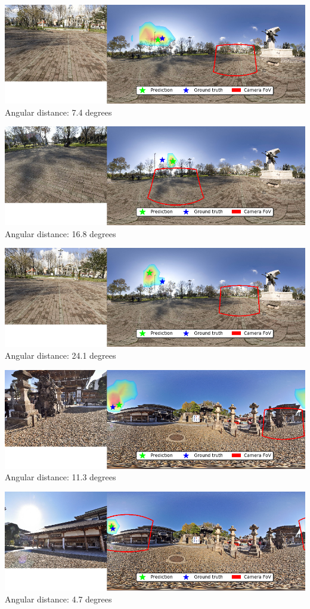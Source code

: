 \begin{multicols}{2}
\includegraphics[width=\mywidth]{pano_aaqhsrljfiqght_005.jpg}\\
Angular distance: 7.4 degrees

\includegraphics[width=\mywidth]{pano_aaqhsrljfiqght_002.jpg}\\
Angular distance: 16.8 degrees

\includegraphics[width=\mywidth]{pano_aaqhsrljfiqght_003.jpg}\\
Angular distance: 24.1 degrees

\includegraphics[width=\mywidth]{pano_aaqpmaoqocdqfu_007.jpg}\\
Angular distance: 11.3 degrees

\includegraphics[width=\mywidth]{pano_aaqpmaoqocdqfu_006.jpg}\\
Angular distance: 4.7 degrees


\end{multicols}
